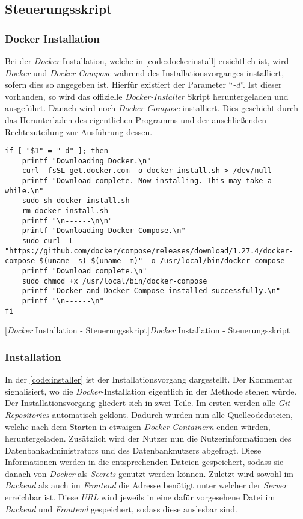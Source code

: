 \subsection{Steuerungsskript}
\subsubsection{Docker Installation}

Bei der \textit{Docker} Installation, welche in \autoref{code:dockerinstall} ersichtlich ist, wird \textit{Docker} und \textit{Docker-Compose} während des Installationsvorganges installiert, sofern dies so angegeben ist. Hierfür existiert der Parameter \enquote{\textit{-d}}. Ist dieser vorhanden, so wird das offizielle \textit{Docker-Installer} Skript heruntergeladen und ausgeführt. Danach wird noch \textit{Docker-Compose} installiert. Dies geschieht durch das Herunterladen des eigentlichen Programms und der anschließenden Rechtezuteilung zur Ausführung dessen.

\begin{verbatim}
if [ "$1" = "-d" ]; then
	printf "Downloading Docker.\n"
	curl -fsSL get.docker.com -o docker-install.sh > /dev/null
	printf "Download complete. Now installing. This may take a while.\n"
	sudo sh docker-install.sh
	rm docker-install.sh
	printf "\n------\n\n"
	printf "Downloading Docker-Compose.\n"
	sudo curl -L "https://github.com/docker/compose/releases/download/1.27.4/docker-compose-$(uname -s)-$(uname -m)" -o /usr/local/bin/docker-compose
	printf "Download complete.\n"
	sudo chmod +x /usr/local/bin/docker-compose
	printf "Docker and Docker Compose installed successfully.\n"
	printf "\n------\n"
fi
\end{verbatim}
[\textit{Docker} Installation - Steuerungsskript]{\textit{Docker} Installation - Steuerungsskript}
\label{code:dockerinstall}

\subsubsection{Installation}

In der \autoref{code:installer} ist der Installationsvorgang dargestellt. Der Kommentar signalisiert, wo die \textit{Docker}-Installation eigentlich in der Methode stehen würde. Der Installationsvorgang gliedert sich in zwei Teile. Im ersten werden alle \textit{Git}-\textit{Repositories} automatisch geklont. Dadurch wurden nun alle Quellcodedateien, welche nach dem Starten in etwaigen \textit{Docker}-\textit{Containern} enden würden, heruntergeladen. Zusätzlich wird der Nutzer nun die Nutzerinformationen des Datenbankadministrators und des Datenbanknutzers abgefragt. Diese Informationen werden in die entsprechenden Dateien gespeichert, sodass sie danach von \textit{Docker} als \textit{Secrets} genutzt werden können. Zuletzt wird sowohl im \textit{Backend} als auch im \textit{Frontend} die Adresse benötigt unter welcher der \textit{Server} erreichbar ist. Diese \textit{URL} wird jeweils in eine dafür vorgesehene Datei im \textit{Backend} und \textit{Frontend} gespeichert, sodass diese auslesbar sind.

